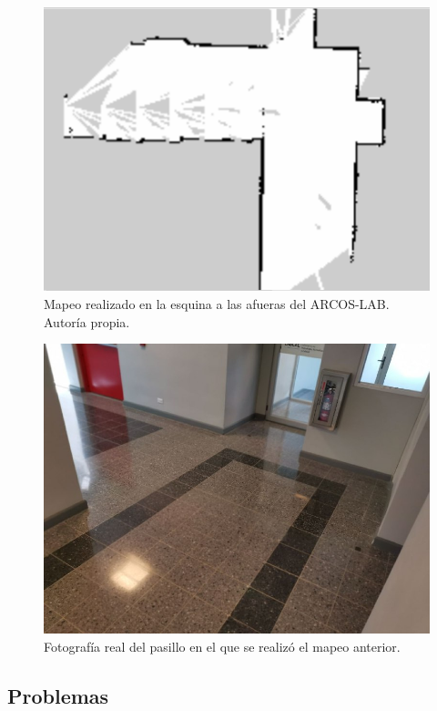 \begin{figure}
\centering
\includegraphics[scale=0.5]{imagenes/mapeo_esquina.png}
\caption{Mapeo realizado en la esquina a las afueras del ARCOS-LAB. Autoría propia.}
\end{figure}

\begin{figure}
\centering
\includegraphics[scale=0.5]{imagenes/afueras_arcoslab.jpg}
\caption{Fotografía real del pasillo en el que se realizó el mapeo anterior.}
\end{figure}

\subsection{Problemas}

